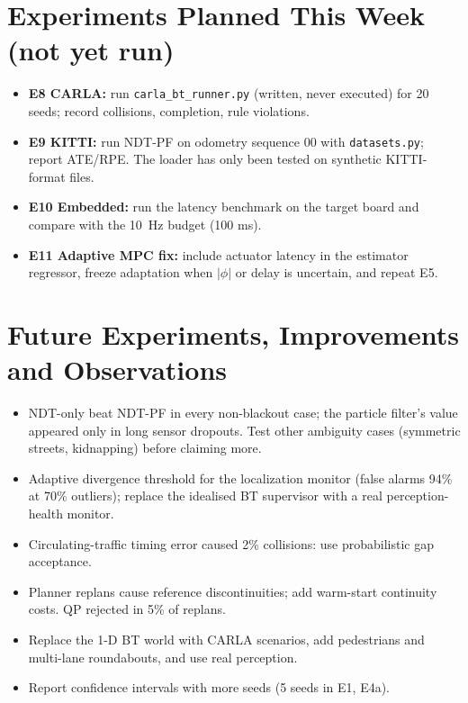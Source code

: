\documentclass[conference]{IEEEtran}
\begin{document}
\section{Experiments Planned This Week (not yet run)}
\begin{itemize}
\item \textbf{E8 CARLA:} run \texttt{carla\_bt\_runner.py} (written, never executed) for 20 seeds; record collisions, completion, rule violations.
\item \textbf{E9 KITTI:} run NDT-PF on odometry sequence 00 with \texttt{datasets.py}; report ATE/RPE. The loader has only been tested on synthetic KITTI-format files.
\item \textbf{E10 Embedded:} run the latency benchmark on the target board and compare with the 10~Hz budget (100 ms).
\item \textbf{E11 Adaptive MPC fix:} include actuator latency in the estimator regressor, freeze adaptation when $|\phi|$ or delay is uncertain, and repeat E5.
\end{itemize}

\section{Future Experiments, Improvements and Observations}
\begin{itemize}
\item NDT-only beat NDT-PF in every non-blackout case; the particle filter's value appeared only in long sensor dropouts. Test other ambiguity cases (symmetric streets, kidnapping) before claiming more.
\item Adaptive divergence threshold for the localization monitor (false alarms 94\% at 70\% outliers); replace the idealised BT supervisor with a real perception-health monitor.
\item Circulating-traffic timing error caused 2\% collisions: use probabilistic gap acceptance.
\item Planner replans cause reference discontinuities; add warm-start continuity costs. QP rejected in 5\% of replans.
\item Replace the 1-D BT world with CARLA scenarios, add pedestrians and multi-lane roundabouts, and use real perception.
\item Report confidence intervals with more seeds (5 seeds in E1, E4a).
\end{itemize}
\end{document}
